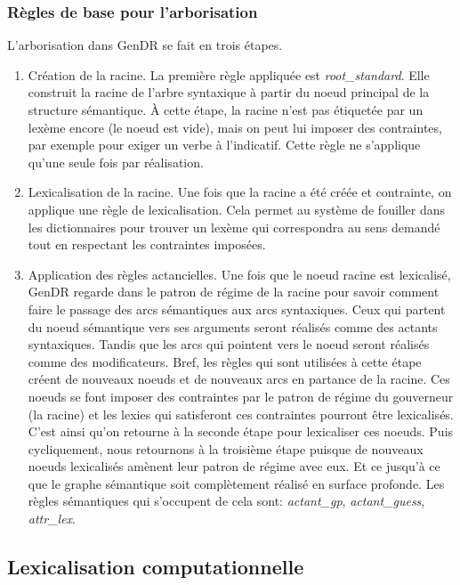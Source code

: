 \subsubsection{Règles de base pour l'arborisation}
L'arborisation dans GenDR se fait en trois étapes.

\begin{enumerate}
  \item Création de la racine.
  La première règle appliquée est \emph{root\_standard}. Elle construit la racine de l'arbre syntaxique à partir du noeud principal de la structure sémantique. À cette étape, la racine n'est pas étiquetée par un lexème encore (le noeud est vide), mais on peut lui imposer des contraintes, par exemple pour exiger un verbe à l'indicatif. Cette règle ne s'applique qu'une seule fois par réalisation.

  \item Lexicalisation de la racine.
  Une fois que la racine a été créée et contrainte, on applique une règle de lexicalisation. Cela permet au système de fouiller dans les dictionnaires pour trouver un lexème qui correspondra au sens demandé tout en respectant les contraintes imposées.

  \item Application des règles actancielles.
  Une fois que le noeud racine est lexicalisé, GenDR regarde dans le patron de régime de la racine pour savoir comment faire le passage des arcs sémantiques aux arcs syntaxiques. Ceux qui partent du noeud sémantique vers ses arguments seront réalisés comme des actants syntaxiques. Tandis que les arcs qui pointent vers le noeud seront réalisés comme des modificateurs. Bref, les règles qui sont utilisées à cette étape créent de nouveaux noeuds et de nouveaux arcs en partance de la racine. Ces noeuds se font imposer des contraintes par le patron de régime du gouverneur (la racine) et les lexies qui satisferont ces contraintes pourront être lexicalisés. C'est ainsi qu'on retourne à la seconde étape pour lexicaliser ces noeuds. Puis cycliquement, nous retournons à la troisième étape puisque de nouveaux noeuds lexicalisés amènent leur patron de régime avec eux. Et ce jusqu'à ce que le graphe sémantique soit complètement réalisé en surface profonde. Les règles sémantiques qui s'occupent de cela sont: \emph{actant\_gp}, \emph{actant\_guess}, \emph{attr\_lex}.
\end{enumerate}

\subsection{Lexicalisation computationnelle} 

